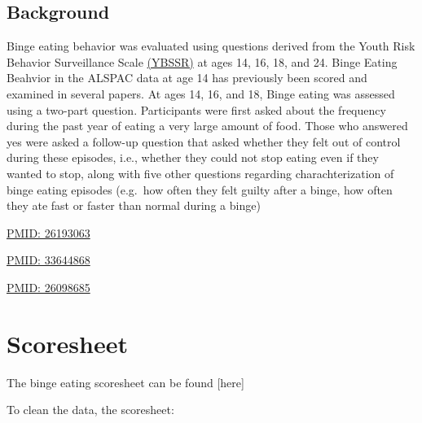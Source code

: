 \documentclass[
]{book}
\begin{document}
\hypertarget{background-1}{%
\subsection{Background}\label{background-1}}

Binge eating behavior was evaluated using questions derived from the Youth Risk Behavior Surveillance Scale \href{https://pubmed.ncbi.nlm.nih.gov/8981266/}{(YBSSR)} at ages 14, 16, 18, and 24. Binge Eating Beahvior in the ALSPAC data at age 14 has previously been scored and examined in several papers. At ages 14, 16, and 18, Binge eating was assessed using a two-part question. Participants were first asked about the frequency during the past year of eating a very large amount of food. Those who answered yes were asked a follow-up question that asked whether they felt out of control during these episodes, i.e., whether they could not stop eating even if they wanted to stop, along with five other questions regarding charachterization of binge eating episodes (e.g.~how often they felt guilty after a binge, how often they ate fast or faster than normal during a binge)

\href{https://pubmed.ncbi.nlm.nih.gov/26193063/}{PMID: 26193063}

\href{https://pubmed.ncbi.nlm.nih.gov/33644868/}{PMID: 33644868}

\href{https://pubmed.ncbi.nlm.nih.gov/26098685/}{PMID: 26098685}

\hypertarget{scoresheet}{%
\section{Scoresheet}\label{scoresheet}}

The binge eating scoresheet can be found {[}here{]}

To clean the data, the scoresheet:
\end{document}
